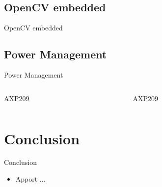 \documentclass[11pt]{beamer}
\begin{document}
	\subsection{OpenCV embedded}
	\begin{frame}{OpenCV embedded}
		\begin{center}
			
		\end{center}
	\end{frame}
	
	\subsection{Power Management}
	\begin{frame}{Power Management}
		\begin{columns}[t]
		\begin{column}{5cm}
		AXP209
		\end{column}
		\begin{column}{5cm}
		AXP209
		\end{column}
		\end{columns}
		
	\end{frame}
	
	\section{Conclusion}
	\begin{frame}{Conclusion}
		\begin{center}
		\begin{itemize}
			\item Apport ...
		\end{itemize}
		\end{center}
	\end{frame}
\end{document}

